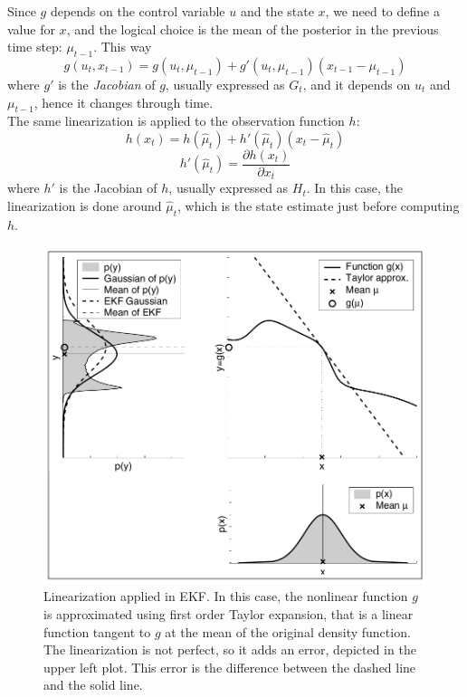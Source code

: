  Since $g$ depends on the control variable $u$ and the state $x$, we need to define a value for $x$, and the logical choice is the mean of the posterior in the previous time step: $\mu_{t-1}$. This way
 \begin{equation}
    g \left(u_t, x_{t-1}\right) = g \left(u_t, \mu_{t-1}\right) + g' \left(u_t, \mu_{t-1}\right)\left(x_{t-1} - \mu_{t-1}\right)
    \label{eq:chapter1:kf:ekf:g-mean-cov}
 \end{equation}
where $g'$ is the \emph{Jacobian} of $g$, usually expressed as $G_t$, and it depends on $u_t$ and $\mu_{t-1}$, hence it changes through time.\\

The same linearization is applied to the observation function $h$:
\begin{equation}
    h\left(x_t\right) = h\left(\hat\mu_t\right) + h'\left(\hat\mu_t\right)\left(x_t - \hat\mu_t\right)
\end{equation}
\begin{equation}
        h'\left(\hat\mu_t\right) = \frac{\partial h\left(x_t\right)}{\partial x_t}
\end{equation}
where $h'$ is the Jacobian of $h$, usually expressed as $H_t$. In this case, the linearization is done around $\hat\mu_t$, which is the state estimate just before computing $h$.\\

\begin{figure}[h]
    \centering
    \includegraphics{Figures/fig2-ekf-linearization.png}
    \caption[Linearization applied in EKF]{Linearization applied in EKF. In this case, the nonlinear function $g$ is approximated using first order Taylor expansion, that is a linear function tangent to $g$ at the mean of the original density function. The linearization is not perfect, so it adds an error, depicted in the upper left plot. This error is the difference between the dashed line and the solid line. \cite{prob-robotics}}
    \label{fig:chapter1:kf:ekf:ekf-linearization}
\end{figure}


